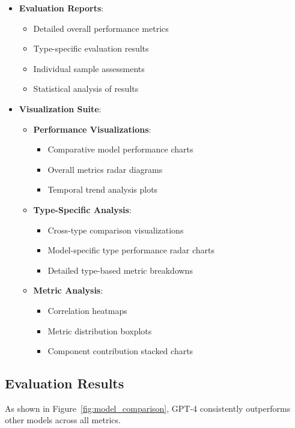 \begin{itemize}
    \item \textbf{Evaluation Reports}:
    \begin{itemize}
        \item Detailed overall performance metrics
        \item Type-specific evaluation results
        \item Individual sample assessments
        \item Statistical analysis of results
    \end{itemize}

    \item \textbf{Visualization Suite}:
    \begin{itemize}
        \item \textbf{Performance Visualizations}:
        \begin{itemize}
            \item Comparative model performance charts
            \item Overall metrics radar diagrams
            \item Temporal trend analysis plots
        \end{itemize}

        \item \textbf{Type-Specific Analysis}:
        \begin{itemize}
            \item Cross-type comparison visualizations
            \item Model-specific type performance radar charts
            \item Detailed type-based metric breakdowns
        \end{itemize}

        \item \textbf{Metric Analysis}:
        \begin{itemize}
            \item Correlation heatmaps
            \item Metric distribution boxplots
            \item Component contribution stacked charts
        \end{itemize}
    \end{itemize}
\end{itemize}

\subsection{Evaluation Results}
As shown in Figure~\ref{fig:model_comparison}, GPT-4 consistently outperforms other models across all metrics.


